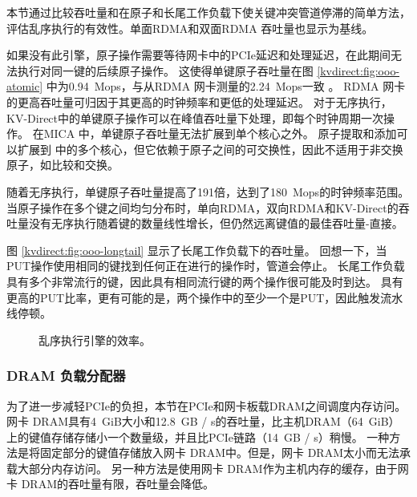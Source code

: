 \label{kvdirect:sec:ooo-eval}

本节通过比较吞吐量和在原子和长尾工作负载下使关键冲突管道停滞的简单方法，评估乱序执行的有效性。单面RDMA和双面RDMA \cite {kalia2016design}吞吐量也显示为基线。

如果没有此引擎，原子操作需要等待网卡中的PCIe延迟和处理延迟，在此期间无法执行对同一键的后续原子操作。
这使得单键原子吞吐量在图 \ref{kvdirect:fig:ooo-atomic} 中为0.94~Mops，与从RDMA 网卡测量的2.24~Mops一致 \cite {kalia2016design}。
RDMA 网卡的更高吞吐量可归因于其更高的时钟频率和更低的处理延迟。
对于无序执行，KV-Direct中的单键原子操作可以在峰值吞吐量下处理，即每个时钟周期一次操作。
在MICA \cite {lim2014mica} 中，单键原子吞吐量无法扩展到单个核心之外。
原子提取和添加可以扩展到 \cite {kalia2016design} 中的多个核心，但它依赖于原子之间的可交换性，因此不适用于非交换原子，如比较和交换。

随着无序执行，单键原子吞吐量提高了191倍，达到了180~Mops的时钟频率范围。
当原子操作在多个键之间均匀分布时，单向RDMA，双向RDMA和KV-Direct的吞吐量没有无序执行随着键的数量线性增长，但仍然远离键值的最佳吞吐量-直接。

图 \ref {kvdirect:fig:ooo-longtail} 显示了长尾工作负载下的吞吐量。
回想一下，当PUT操作使用相同的键找到任何正在进行的操作时，管道会停止。
长尾工作负载具有多个非常流行的键，因此具有相同流行键的两个操作很可能及时到达。
具有更高的PUT比率，更有可能的是，两个操作中的至少一个是PUT，因此触发流水线停顿。


\begin{figure}[htbp]
	\centering
	\caption{乱序执行引擎的效率。}
	\label{kvdirect:fig:ooo-eval}
\end{figure}



\subsubsection{DRAM 负载分配器}
\label{kvdirect:sec:dram-cache}

为了进一步减轻PCIe的负担，本节在PCIe和网卡板载DRAM之间调度内存访问。
网卡 DRAM具有4~GiB大小和12.8~GB / s的吞吐量，比主机DRAM（64~GiB）上的键值存储存储小一个数量级，并且比PCIe链路（14~GB / s）稍慢。
一种方法是将固定部分的键值存储放入网卡 DRAM中。但是，网卡 DRAM太小而无法承载大部分内存访问。
另一种方法是使用网卡 DRAM作为主机内存的缓存，由于网卡 DRAM的吞吐量有限，吞吐量会降低。


